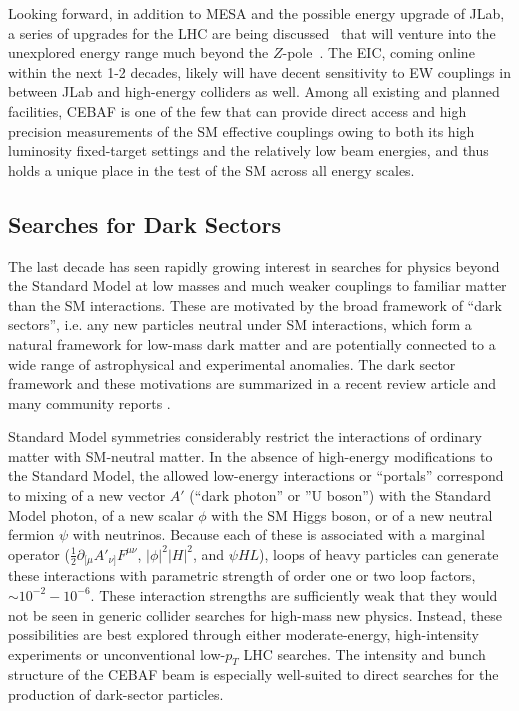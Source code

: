Looking forward, in addition to MESA and the possible energy upgrade of JLab, a series of upgrades for the LHC are being discussed~\cite{LHeCStudyGroup:2012zhm,LHeC:2020van,FCC:2018byv,FCC:2018evy} that will venture into the unexplored energy range much beyond the $Z$-pole~\cite{Britzger:2020kgg}. %
The EIC, coming online within the next 1-2 decades, likely will have decent sensitivity to EW couplings in between JLab and high-energy colliders as well. %
 Among all existing and planned facilities, CEBAF is one of the few that can provide direct access and high precision measurements of the SM effective couplings owing to both its high luminosity fixed-target settings and the relatively low beam energies, and thus holds a unique place in the test of the SM across all energy scales.  

\subsection{ Searches for Dark Sectors}
\label{sec:APEXHPS}
\label{sec:BDX}
The last decade has seen rapidly growing interest in searches for physics beyond the Standard Model at low masses and much weaker couplings to familiar matter than the SM interactions.  These are motivated by the broad framework of ``dark sectors'', i.e. any new particles neutral under SM interactions, which form a natural framework for low-mass dark matter and are potentially connected to a wide range of astrophysical and experimental anomalies.  The dark sector framework and these motivations are summarized in a recent review article \cite{Lanfranchi:2020crw} and many community reports \cite{Alexander:2016aln,Battaglieri:2017aum,DarkMatterBRNReport,Beacham:2019nyx,Agrawal:2021dbo}.  

Standard Model symmetries considerably restrict the interactions of ordinary matter with SM-neutral matter. In the absence of high-energy modifications to the Standard Model, the allowed low-energy interactions or ``portals'' correspond to mixing of a new vector $A'$ (``dark photon'' or ''U boson'') with the Standard Model photon, of a new scalar $\phi$ with the SM Higgs boson, or of a new neutral fermion $\psi$ with neutrinos. Because each of these is associated with a marginal operator ($ \frac{1}{2}\partial_{[\mu} A'_{\nu]} F^{\mu\nu}$,  $|\phi|^2 |H|^2$, and $\psi HL$), loops of heavy particles can generate these interactions with parametric strength of order one or two loop factors, $\sim 10^{-2} - 10^{-6}$.   These interaction strengths are sufficiently weak that they would not be seen in generic collider searches for high-mass new physics.  Instead, these possibilities are best explored through either moderate-energy, high-intensity experiments or unconventional low-$p_T$ LHC searches.  The intensity and bunch structure of the CEBAF beam is especially well-suited to direct searches for the production of dark-sector particles. 

